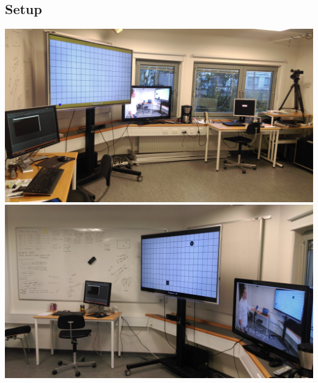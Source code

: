 \subsection*{\pictures}

\subsection*{Setup}
\includegraphics[width=\textwidth]{files/setup_left.jpg}
\\ \vspace{1cm}
\includegraphics[width=\textwidth]{files/setup_right.jpg}


